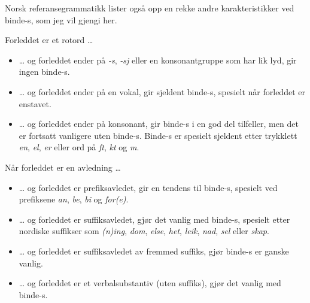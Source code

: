 Norsk referansegrammatikk\cite{faarlund1997norsk} lister også opp en rekke andre karakteristikker ved binde-s, som jeg vil gjengi her.

\begin{items}
	\item Forleddet er et rotord …
	\begin{itemize}
		\item … og forleddet ender på \textit{-s}, \textit{-sj} eller en konsonantgruppe som har lik lyd, gir ingen binde-s.
		
		
		\item … og forleddet ender på en vokal, gir sjeldent binde-s, spesielt når forleddet er enstavet.
		
		
		\item … og forleddet ender på konsonant, gir binde-s i en god del tilfeller, men det er fortsatt vanligere uten binde-s. Binde-s er spesielt sjeldent etter trykklett \textit{en}, \textit{el}, \textit{er} eller ord på \textit{ft}, \textit{kt} og \textit{m}.
		
		
	\end{itemize}
	
	\item Når forleddet er en avledning …
	\begin{itemize}
		\item … og forleddet er prefiksavledet, gir en tendens til binde-s, spesielt ved prefiksene \textit{an}, \textit{be}, \textit{bi} og \textit{for(e)}.
		
		
		\item … og forleddet er suffiksavledet, gjør det vanlig med binde-s, spesielt etter nordiske suffikser som \textit{(n)ing}, \textit{dom}, \textit{else}, \textit{het}, \textit{leik}, \textit{nad}, \textit{sel} eller \textit{skap}.
		
		
		\item … og forleddet er suffiksavledet av fremmed suffiks, gjør binde-s er ganske vanlig. 
		
		
		\item … og forleddet er et verbalsubstantiv (uten suffiks), gjør det vanlig med binde-s. 
		

\end{itemize}
\end{items}
